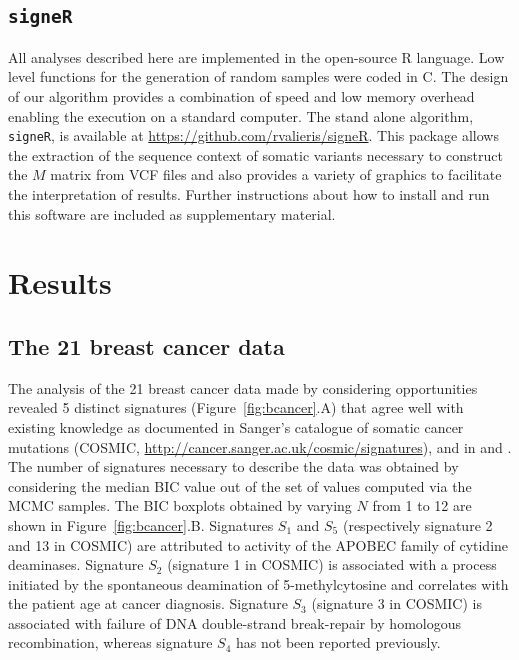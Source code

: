 \documentclass{bioinfo}
\newcommand{\CC}{C\nolinebreak\hspace{-.05em}\raisebox{.4ex}{\tiny
    +}\nolinebreak\hspace{-.15em}\raisebox{.4ex}{\tiny +}}
\begin{document}
\subsection{\texttt{signeR}}
All analyses described here are implemented in the open-source R
language. Low level functions for the generation of random samples
were coded in \CC. The design of our algorithm provides a combination
of speed and low memory overhead enabling the execution on a standard
computer. The stand alone algorithm, \texttt{signeR}, is available at
\url{https://github.com/rvalieris/signeR}. This package allows the 
extraction of the sequence context of somatic variants
necessary to construct the $M$ matrix from VCF files and also
provides a variety of graphics to facilitate the interpretation of
results. Further instructions about how to install and run this
software are included as supplementary material.

\section{Results}
\subsection{The 21 breast cancer data}
The analysis of the 21 breast cancer data made by considering
opportunities revealed 5 distinct signatures
(Figure~\ref{fig:bcancer}.A) that agree well with existing knowledge
as documented in Sanger's catalogue of somatic cancer mutations
(COSMIC, \url{http://cancer.sanger.ac.uk/cosmic/signatures}), and
in \cite{HEN} and \cite{ANat}. The number of signatures necessary to
describe the data was obtained by considering the median BIC value out
of the set of values computed via the MCMC samples. The BIC boxplots
obtained by varying $N$ from 1 to 12 are shown in
Figure~\ref{fig:bcancer}.B. Signatures $S_1$ and $S_5$ (respectively
signature 2 and 13 in COSMIC) are attributed to activity of the APOBEC
family of cytidine deaminases.  Signature $S_2$ (signature 1 in
COSMIC) is associated with a process initiated by the spontaneous
deamination of 5-methylcytosine and correlates with the patient age at 
cancer diagnosis. Signature $S_3$ (signature 3 in COSMIC) is
associated with failure of DNA double-strand break-repair by
homologous recombination, whereas signature $S_4$ has not been
reported previously.
\end{document}
